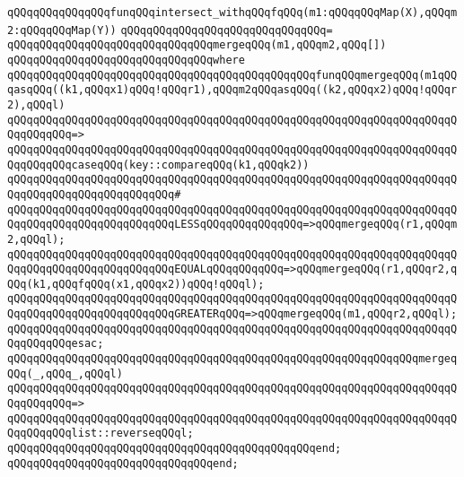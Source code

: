 \verb|qQQqqQQqqQQqqQQqfunqQQqintersect_withqQQqfqQQq(m1:qQQqqQQqMap(X),qQQqm2:qQQqqQQqMap(Y))|\newline
\verb|qQQqqQQqqQQqqQQqqQQqqQQqqQQqqQQq=|\newline
\verb|qQQqqQQqqQQqqQQqqQQqqQQqqQQqqQQqmergeqQQq(m1,qQQqm2,qQQq[])|\newline
\verb|qQQqqQQqqQQqqQQqqQQqqQQqqQQqqQQqwhere|\newline
\verb|qQQqqQQqqQQqqQQqqQQqqQQqqQQqqQQqqQQqqQQqqQQqqQQqfunqQQqmergeqQQq(m1qQQqasqQQq((k1,qQQqx1)qQQq!qQQqr1),qQQqm2qQQqasqQQq((k2,qQQqx2)qQQq!qQQqr2),qQQql)|\newline
\verb|qQQqqQQqqQQqqQQqqQQqqQQqqQQqqQQqqQQqqQQqqQQqqQQqqQQqqQQqqQQqqQQqqQQqqQQqqQQqqQQq=>|\newline
\verb|qQQqqQQqqQQqqQQqqQQqqQQqqQQqqQQqqQQqqQQqqQQqqQQqqQQqqQQqqQQqqQQqqQQqqQQqqQQqqQQqcaseqQQq(key::compareqQQq(k1,qQQqk2))|\newline
\verb|qQQqqQQqqQQqqQQqqQQqqQQqqQQqqQQqqQQqqQQqqQQqqQQqqQQqqQQqqQQqqQQqqQQqqQQqqQQqqQQqqQQqqQQqqQQqqQQq#|\newline
\verb|qQQqqQQqqQQqqQQqqQQqqQQqqQQqqQQqqQQqqQQqqQQqqQQqqQQqqQQqqQQqqQQqqQQqqQQqqQQqqQQqqQQqqQQqqQQqqQQqLESSqQQqqQQqqQQqqQQq=>qQQqmergeqQQq(r1,qQQqm2,qQQql);|\newline
\verb|qQQqqQQqqQQqqQQqqQQqqQQqqQQqqQQqqQQqqQQqqQQqqQQqqQQqqQQqqQQqqQQqqQQqqQQqqQQqqQQqqQQqqQQqqQQqqQQqEQUALqQQqqQQqqQQq=>qQQqmergeqQQq(r1,qQQqr2,qQQq(k1,qQQqfqQQq(x1,qQQqx2))qQQq!qQQql);|\newline
\verb|qQQqqQQqqQQqqQQqqQQqqQQqqQQqqQQqqQQqqQQqqQQqqQQqqQQqqQQqqQQqqQQqqQQqqQQqqQQqqQQqqQQqqQQqqQQqqQQqGREATERqQQq=>qQQqmergeqQQq(m1,qQQqr2,qQQql);|\newline
\verb|qQQqqQQqqQQqqQQqqQQqqQQqqQQqqQQqqQQqqQQqqQQqqQQqqQQqqQQqqQQqqQQqqQQqqQQqqQQqqQQqesac;|\newline
\newline
\verb|qQQqqQQqqQQqqQQqqQQqqQQqqQQqqQQqqQQqqQQqqQQqqQQqqQQqqQQqqQQqqQQqmergeqQQq(_,qQQq_,qQQql)|\newline
\verb|qQQqqQQqqQQqqQQqqQQqqQQqqQQqqQQqqQQqqQQqqQQqqQQqqQQqqQQqqQQqqQQqqQQqqQQqqQQqqQQq=>|\newline
\verb|qQQqqQQqqQQqqQQqqQQqqQQqqQQqqQQqqQQqqQQqqQQqqQQqqQQqqQQqqQQqqQQqqQQqqQQqqQQqqQQqlist::reverseqQQql;|\newline
\verb|qQQqqQQqqQQqqQQqqQQqqQQqqQQqqQQqqQQqqQQqqQQqqQQqend;|\newline
\verb|qQQqqQQqqQQqqQQqqQQqqQQqqQQqqQQqend;|\newline
\newline
